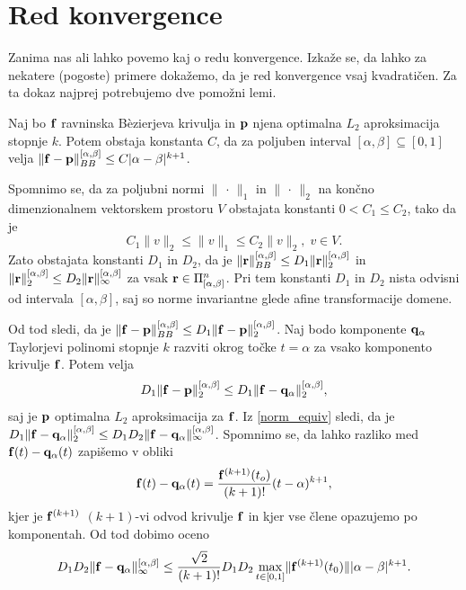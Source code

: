 
\section{Red konvergence}

Zanima nas ali lahko povemo kaj o redu konvergence. Izkaže se, da lahko za nekatere (pogoste) primere dokažemo, da je red konvergence vsaj kvadratičen. Za ta dokaz najprej potrebujemo dve pomožni lemi.

\begin{lema}\label{prvalema}
Naj bo ${\bf f}$ ravninska B\`{e}zierjeva krivulja in ${\bf p}$ njena optimalna $L_2$ aproksimacija stopnje $k$. Potem obstaja konstanta $C$, da za poljuben interval $[\alpha,\beta]\subseteq[0,1]$ velja $\lVert {\bf f} - {\bf p} \rVert _{BB}^{[\alpha,\beta]} \leq C |\alpha - \beta|^{k+1}$.
\end{lema}
\proof
Spomnimo se, da za poljubni normi $\lVert\, \cdot\, \rVert _1$ in $\lVert\, \cdot \,\rVert _2$ na končno dimenzionalnem vektorskem prostoru $V$ obstajata konstanti $0 < C_1 \leq C_2$, tako da je 
\begin{equation}\label{norm_equiv}
C_1 \lVert v\rVert _2 \leq \lVert v\rVert _1 \leq C_2 \lVert v\rVert _2, \; v\in V.
\end{equation}
Zato obstajata konstanti $D_1$ in $D_2$, da je $\lVert {\bf r}\rVert _{BB}^{[\alpha,\beta]} \leq D_1 \lVert {\bf r}\rVert _2^{[\alpha,\beta]}$ in $\lVert {\bf r}\rVert _{2}^{[\alpha,\beta]} \leq D_2 \lVert {\bf r}\rVert _\infty^{[\alpha,\beta]}$ za vsak ${\bf r}\in  \Pi _{[\alpha,\beta]}^n$. Pri tem konstanti $D_1$ in $D_2$ nista odvisni od intervala $[\alpha,\beta]$, saj so norme invariantne glede afine transformacije domene.

Od tod sledi, da je 
$\lVert {\bf f} - {\bf p} \rVert _{BB}^{[\alpha,\beta]} \leq D_1 \lVert {\bf f} - {\bf p} \rVert _{2}^{[\alpha,\beta]}$. Naj bodo komponente ${\bf q}_\alpha$ Taylorjevi polinomi stopnje $k$ razviti okrog točke $t = \alpha$ za vsako komponento krivulje ${\bf f}$. Potem velja
$$
D_1 \lVert {\bf f} - {\bf p} \rVert _{2}^{[\alpha,\beta]} \leq D_1 \lVert {\bf f} - {\bf q}_\alpha \rVert _{2}^{[\alpha,\beta]},
$$
saj je ${\bf p}$ optimalna $L_2$ aproksimacija za ${\bf f}$. Iz \ref{norm_equiv} sledi, da je 
$
D_1 \lVert {\bf f} - {\bf q}_\alpha \rVert _{2}^{[\alpha,\beta]} \leq D_1D_2 \lVert {\bf f} - {\bf q}_\alpha \rVert _{\infty}^{[\alpha,\beta]}
$. Spomnimo se, da lahko razliko med ${\bf f}(t) - {\bf q}_\alpha(t)$ zapišemo v obliki
$$
{\bf f}(t) - {\bf q}_\alpha(t) = \frac{{\bf f}^{(k+1)}(t_o)}{(k+1)!}(t-\alpha)^{k+1},
$$
kjer je ${\bf f}^{(k+1)}$ $(k+1)$-vi odvod krivulje ${\bf f}$ in kjer vse člene opazujemo po komponentah. Od tod dobimo oceno
$$
D_1D_2 \lVert {\bf f} - {\bf q}_\alpha \rVert _{\infty}^{[\alpha,\beta]} \leq
\frac{\sqrt{2}}{(k+1)!}D_1D_2\max _{t\in [0,1]} \lVert {\bf f}^{(k+1)}(t_0) \rVert |\alpha - \beta|^{k+1}.
$$
\endproof

